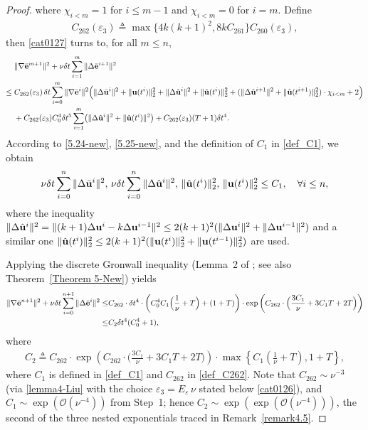 \documentclass{article}
\theoremstyle{definition}                   %
\begin{document}
\begin{proof}
where $\chi_{i<m}=1$ for $i\le m-1$ and $\chi_{i<m}=0$ for $i=m$.
%
Define 
\begin{align}
C_{262}(\varepsilon_3) \triangleq \max\{4k(k+1)^2, 8k C_{261} \} C_{260}(\varepsilon_3),
\label{def_C262}
\end{align}
then \eqref{cat0127} turns to, for all $m\le n$, 
\begin{align}
& \|\nabla\bar{\bf e}^{m+1}\|^2
+ \nu\delta t \sum_{i=1}^m \|\Delta\bar{\bf e}^{i+1}\|^2
\notag\\
\le\;&
C_{262}(\varepsilon_3)\,\delta t
\sum_{i=0}^m \|\nabla\bar{\bf e}^i\|^2
\Bigl(
\|\Delta\bar{\bf u}^i\|^2 + \|{\bf u}(t^i)\|_2^2
+ \|\Delta\hat{\bf u}^i\|^2 + \|\hat{\bf u}(t^i)\|_2^2
 +  (\|\Delta\hat{\bf{u}}^{i+1}\|^2 + \|\hat{\bf{u}}(t^{i+1})\|^2_2) \cdot \chi_{i<m}   +2
\Bigr) 
\notag\\
&
+ C_{262}(\varepsilon_3) C_0^4 \delta t^5
\sum_{i=1}^m
\bigl(\|\Delta\hat{\bf u}^i\|^2
+ \|\hat{\bf u}(t^i)\|^2\bigr)
+ C_{262}(\varepsilon_3)(T+1)\delta t^4.
\label{5.49-new}
\end{align}
%
According to \eqref{5.24-new}, \eqref{5.25-new}, and the  definition of $C_1$ in \eqref{def_C1}, we obtain 
\begin{align}
\nu\delta t\sum_{i=0}^n\|\Delta\bar{\bf{u}}^i\|^2, \,
\nu\delta t\sum_{i=0}^n\|\Delta\hat{\bf{u}}^i\|^2, \,
\|\hat{\bf{u}}(t^i)\|^2_2, \,
\|{\bf{u}}(t^i)\|^2_2 \le C_1, 
\quad \forall i\le n,
\label{5.50-new}
\end{align}
where the inequality $\|\Delta\hat{\bf{u}}^i\|^2 
= \|(k+1)\Delta {\bf u}^i- k \Delta{\bf u}^{i-1} \|^2
\le 2(k+1)^2 (\|\Delta {\bf u}^i\|^2 + \|\Delta {\bf u}^{i-1} \|^2)$ and a similar one $\|\hat{\bf{u}}(t^i)\|^2_2
\le 2(k+1)^2 (\|{\bf u}(t^i)\|^2_2+\|{\bf u}(t^{i-1})\|^2_2)$
are used.

Applying the discrete Gronwall inequality (Lemma~2 of \cite{HuangShen2023}; see also Theorem~\ref{Theorem 5-New}) yields
\begin{align}
\|\nabla\bar{\bf{e}}^{n+1}\|^2 
+ \nu\delta t \sum_{i=0}^{n+1} \|\Delta\bar{\bf{e}}^i\|^2
\le& 
C_{262}\cdot \delta t^4 \cdot
\left( C^4_0 C_1 \Big(\frac{1}{\nu}+T\Big) +(1+T) \right)
\cdot
\exp\left( C_{262} \cdot
 \Big( \frac{3C_1}{\nu} + 3 C_1T + 2T\Big)  \right) 
\notag\\
\le & C_2\delta t^4 (C^4_0+1) ,
\label{5.51-new}
\end{align}
where 
\begin{align}
C_2\triangleq  C_{262}\cdot \exp\left( C_{262} \cdot
 \Big( \frac{3C_1}{\nu} + 3 C_1T + 2T\Big)  \right)
\cdot 
\max\left\{ C_1\left(\frac{1}{\nu} +T\right), 1+T \right\},
\end{align}
where $C_1$ is defined in \eqref{def_C1} and $C_{262}$ in \eqref{def_C262}.
%
Note that $C_{262}\sim \nu^{-3}$ (via \eqref{lemma4-Liu} with the choice $\varepsilon_3=E_\varepsilon\,\nu$ stated below \eqref{cat0126}), and $C_1\sim \exp(\mathcal{O}(\nu^{-4}))$ from Step~1; hence $C_2\sim \exp(\exp(\mathcal{O}(\nu^{-4})))$, the second of the three nested exponentials traced in Remark~\ref{remark4.5}.



\end{proof}
\end{document}
